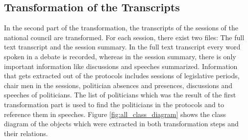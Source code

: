 

\subsection{Transformation of the Transcripts}
In the second part of the transformation, the transcripts of the sessions of the national council are transformed. For each session, there exist two files: The full text transcript and the session summary. In the full text transcript every word spoken in a debate is recorded, whereas in the session summary, there is only important information like discussions and speeches summarized. Information that gets extracted out of the protocols includes sessions of legislative periods, chair men in the sessions, politician absences and presences, discussions and speeches of politicians. The list of politicians which was the result of the first transformation part is used to find the politicians in the protocols and to reference them in speeches. %
Figure \ref{fig:all_class_diagram} shows the class diagram of the objects which were extracted in both transformation steps and their relations.


